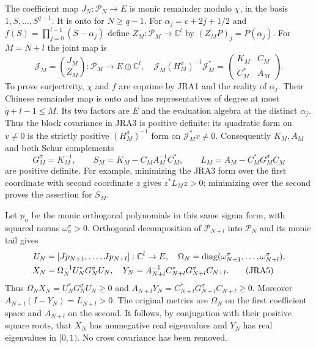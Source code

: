 \documentclass[11pt,a4paper]{article}
\newcommand{\C}{\mathbb C}
\newcommand{\diag}{\operatorname{diag}}
\begin{document}
The coefficient map $J_N:\mathcal P_N\to E$ is monic remainder modulo $\chi$,
in the basis $1,S,\ldots,S^{q-1}$. It is onto for $N\geq q-1$.
For $\alpha_j=c+2j+1/2$ and $f(S)=\prod_{j=0}^{l-1}(S-\alpha_j)$ define
$Z_M:\mathcal P_M\to\C^l$ by $(Z_MP)_j=P(\alpha_j)$.
For $M=N+l$ the joint map is
\begin{equation}
 \mathscr J_M=\binom{J_M}{Z_M}:\mathcal P_M\longrightarrow E\oplus\C^l,
 \quad
 \mathscr J_M(H_M^\sigma)^{-1}\mathscr J_M^*
 =\begin{pmatrix}K_M&C_M\\C_M^*&A_M\end{pmatrix}.
 \tag{JRA3}
\end{equation}
To prove surjectivity, $\chi$ and $f$ are coprime by JRA1 and the reality
of $\alpha_j$. Their Chinese remainder map is onto and has representatives
of degree at most $q+l-1\leq M$. Its two factors are $E$ and the evaluation
algebra at the distinct $\alpha_j$. Thus the block covariance in JRA3 is
positive definite: its quadratic form on $v\ne0$ is the strictly positive
$(H_M^\sigma)^{-1}$ form on $\mathscr J_M^*v\ne0$.
Consequently $K_M,A_M$ and both Schur complements
\begin{equation}
 G_M^\sigma=K_M^{-1},\qquad
 S_M=K_M-C_M A_M^{-1}C_M^*,\qquad
 L_M=A_M-C_M^*G_M^\sigma C_M
 \tag{JRA4}
\end{equation}
are positive definite. For example, minimizing the JRA3 form over the
first coordinate with second coordinate $z$ gives $z^*L_Mz>0$;
minimizing over the second proves the assertion for $S_M$.

Let $p_n$ be the monic orthogonal polynomials in this same sigma form,
with squared norms $\omega_n^\sigma>0$. Orthogonal decomposition of
$\mathcal P_{N+l}$ into $\mathcal P_N$ and its monic tail gives
\begin{align}
 U_N&=[Jp_{N+1},\ldots,Jp_{N+l}]:\C^l\to E,\quad
 \Omega_N=\diag(\omega_{N+1}^\sigma,\ldots,\omega_{N+l}^\sigma),\notag\\
 X_N&=\Omega_N^{-1}U_N^*G_N^\sigma U_N,\quad
 Y_N=A_{N+l}^{-1}C_{N+l}^*G_{N+l}^\sigma C_{N+l}.
 \tag{JRA5}
\end{align}
Thus $\Omega_NX_N=U_N^*G_N^\sigma U_N\geq0$ and
$A_{N+l}Y_N=C_{N+l}^*G_{N+l}^\sigma C_{N+l}\geq0$.
Moreover $A_{N+l}(I-Y_N)=L_{N+l}>0$.
The original metrics are $\Omega_N$ on the first coefficient space and
$A_{N+l}$ on the second. It follows, by conjugation with their positive
square roots, that $X_N$ has nonnegative real eigenvalues and $Y_N$ has
real eigenvalues in $[0,1)$. No cross covariance has been removed.
\end{document}

